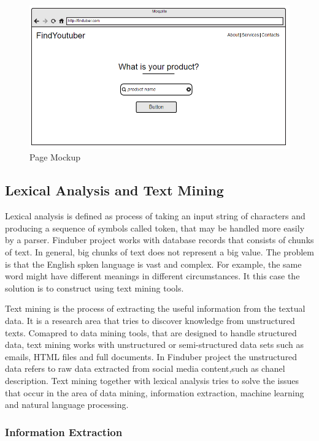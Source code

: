\begin{figure}[!ht]
\centering
\includegraphics[width=15cm]{moch}
\caption{Page Mockup}
\end{figure}


\subsection{Lexical Analysis and Text Mining}

Lexical analysis is defined as process of taking an input string of characters and producing a sequence of symbols called token, that may be handled more easily by a parser. Finduber project works with database records that consists of chunks of text. In general, big chunks of text does not represent a big value. The problem is that the English spken language is vast and complex. For example, the same word might have different meanings in different circumstances. It this case the solution is to construct using text mining tools. 

Text mining is the process of extracting the useful information from the textual data. It is a research area that tries to discover knowledge from unstructured texts. Comapred to data mining tools, that are designed to handle structured data, text mining works with unstructured or semi-structured data sets such as emails, HTML files and full documents.\cite{survey} In Finduber project the unstructured data refers to raw data extracted from social media content,such as chanel description. Text mining together with lexical analysis tries to solve the issues that occur in the area of data mining, information extraction, machine learning and natural language processing. 

\subsubsection{Information Extraction}

